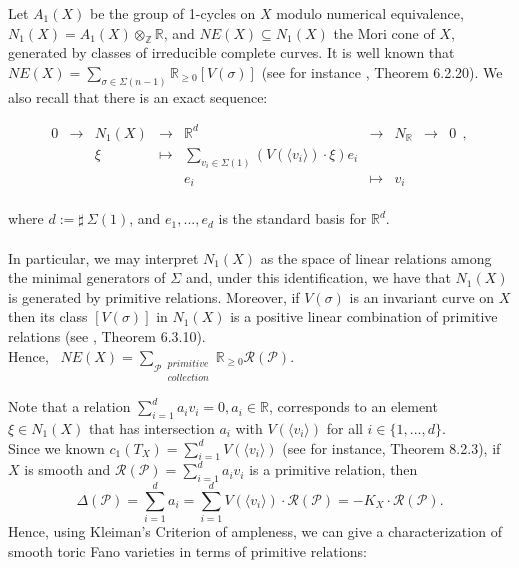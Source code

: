 \documentclass[10pt]{article}
\begin{document}
Let $A_1(X)$ be the group of 1-cycles on $X$ modulo numerical equivalence, $N_1(X)=A_1(X)\otimes_{\mathbb{Z}}\mathbb{R}$, and $NE(X)\subseteq N_1(X)$ the Mori cone of $X$, generated by classes of irreducible complete curves. It is well known that $NE(X)=\displaystyle\sum_{\sigma \in \Sigma(n-1)}\mathbb{R}_{\geq0}[V(\sigma)]$ (see for instance \cite{cox}, Theorem 6.2.20). 
We also recall that there is an exact sequence:

$$
\begin{array}{ccccccccc}
 0 &\longrightarrow& N_1(X) &\longrightarrow& \mathbb{R}^d&\longrightarrow&  N_{\mathbb{R}} &\longrightarrow &0 \ \ ,\\
  &&\xi&\longmapsto &\displaystyle\sum_{v_i\in\Sigma(1)}(V(\langle v_i \rangle)\cdot \xi)e_i  \\
&&&&e_i&\longmapsto & v_i \\
\end{array}
$$

 \noindent where $d:=\sharp \ \Sigma(1)$, and ${e_1,...,e_d}$ is the standard basis for $\mathbb{R}^d$.\\
\\
In particular, we may interpret $N_1(X)$ as the space of linear relations among the minimal generators of $\Sigma$ and, under this identification, we have that $N_1(X)$ is generated by primitive relations. Moreover, if $V(\sigma)$ is an invariant curve on $X$ then its class $[V(\sigma)]$ in $N_1(X)$ is a positive linear combination of primitive relations (see \cite{cox}, Theorem 6.3.10).\\

Hence, \  $NE(X)=\displaystyle\sum_{\mathcal{P} \ \substack{ primitive \\  collection}}\mathbb{R}_{\geq0}\mathcal{R(P)}$.


Note that a relation $\displaystyle\sum_{i=1}^{d}a_iv_i=0, a_i \in \mathbb{R}$, corresponds to an element $\xi\in N_1(X)$ that has intersection $a_i$ with $V(\langle v_i \rangle)$ for all $i\in \{1,...,d\}$.\\
Since we known $c_1(T_X)=\displaystyle \sum_{i=1}^{d}V(\langle v_i \rangle)$ (see for instance, \cite{cox} Theorem 8.2.3), if $X$ is smooth and $\mathcal{R(P)}=\displaystyle\sum_{i=1}^{d}a_iv_i$ is a primitive relation, then $$\Delta(\mathcal{P})=\displaystyle\sum_{i=1}^{d}a_i=\displaystyle\sum_{i=1}^{d}V(\langle v_i \rangle)\cdot\mathcal{R(P)}=-K_X\cdot\mathcal{R(P)}.$$
Hence, using Kleiman's Criterion of ampleness, we can give a characterization of smooth toric Fano varieties in terms of primitive relations:\\
\end{document}
